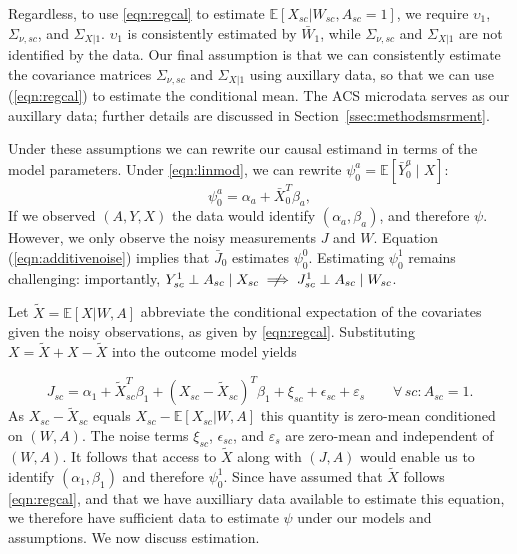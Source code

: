 \documentclass[aoas]{imsart}
\theoremstyle{plain}
\theoremstyle{remark}
\begin{document}
Regardless, to use \eqref{eqn:regcal} to estimate $\mathbb{E}[X_{sc}|W_{sc}, A_{sc}=1]$, we require $\upsilon_1$, $\Sigma_{\nu,sc}$, and $\Sigma_{X|1}$. $\upsilon_1$ is consistently estimated by $\bar{W}_1$, while $\Sigma_{\nu,sc}$ and $\Sigma_{X|1}$ are not identified by the data. Our final assumption is that we can consistently estimate the covariance matrices $\Sigma_{\nu,sc}$ and $\Sigma_{X|1}$ using auxillary data, so that we can use (\ref{eqn:regcal}) to estimate the conditional mean. The ACS microdata serves as our auxillary data; further details are discussed in Section~\ref{ssec:methodsmsrment}.

Under these assumptions we can rewrite our causal estimand in terms of the model parameters. Under \eqref{eqn:linmod}, we can rewrite $\psi_0^a = \mathbb{E}[\bar{Y}_0^a \mid X]$:
\begin{equation}\label{eqn:outcome}
\psi_0^a = \alpha_a + \bar{X}_0^T\beta_a,   
\end{equation}
If we observed $(A, Y, X)$ the data would identify $(\alpha_a, \beta_a)$, and therefore $\psi$. However, we only observe the noisy measurements $J$ and $W$. Equation (\ref{eqn:additivenoise}) implies that $\bar{J}_0$ estimates $\psi_0^0$. Estimating $\psi_0^1$ remains challenging: importantly, $Y_{sc}^1 \perp A_{sc} \mid X_{sc} \centernot\implies J_{sc}^1 \perp A_{sc} \mid W_{sc}$. 

Let $\tilde{X} = \mathbb{E}[X |W, A]$ abbreviate the conditional expectation of the covariates given the noisy observations, as given by \eqref{eqn:regcal}. Substituting $X = \tilde{X} + X - \tilde{X}$ into the outcome model yields

\begin{equation} \label{eqn:JXtilde}
    J_{sc} = \alpha_1 + \tilde{X}_{sc}^T\beta_1 + (X_{sc} - \tilde{X}_{sc})^T\beta_1 + \xi_{sc} + \epsilon_{sc} + \varepsilon_s \qquad\forall\, sc: A_{sc} = 1.
\end{equation}
As $X_{sc} - \tilde{X}_{sc}$ equals $X_{sc} - \mathbb{E}[X_{sc}|W,A]$ this quantity is zero-mean conditioned on $(W,A)$. The noise terms $\xi_{sc}$, $\epsilon_{sc}$, and $\varepsilon_s$ are zero-mean and independent of $(W, A)$. It follows that access to $\tilde{X}$ along with $(J,A)$  would enable us to identify $(\alpha_1, \beta_1)$ and therefore $\psi_0^1$. Since have assumed that $\tilde{X}$ follows \eqref{eqn:regcal}, and that we have auxilliary data available to estimate this equation, we therefore have sufficient data to estimate $\psi$ under our models and assumptions. We now discuss estimation.
\end{document}
